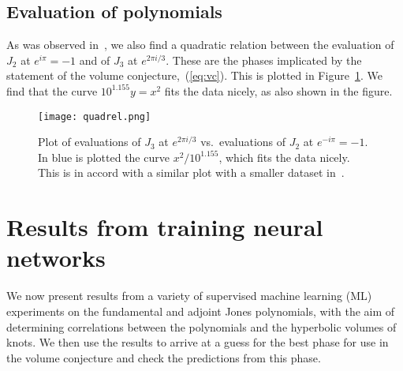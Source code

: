 \documentclass[11pt]{article}
\newcommand{\eref}[1]{(\ref{#1})}
\begin{document}
\subsection{Evaluation of polynomials}

As was observed in~\cite{Craven:2020bdz}, we also find a quadratic relation between the evaluation of $J_2$ at $e^{i\pi}=-1$ and of $J_3$ at $e^{2\pi i/3}$.
These are the phases implicated by the statement of the volume conjecture,~\eref{eq:vc}.
This is plotted in Figure~\ref{fig:quadratic-relation}.
We find that the curve $10^{1.155}y=x^2$ fits the data nicely, as also shown in the figure.

\begin{figure}[h] 
  \begin{center}
    \texttt{[image: quadrel.png]}
  \end{center}
  \caption{\textsf{Plot of evaluations of $J_3$ at $e^{2\pi i/3}$ vs.\ evaluations of $J_2$ at $e^{-i\pi}=-1$. In blue is plotted the curve $x^2/10^{1.155}$, which fits the data nicely. This is in accord with a similar plot with a smaller dataset in~\cite{Craven:2020bdz}.}}  \label{fig:quadratic-relation}
\end{figure}

\section{Results from training neural networks}\label{sec:ml}

We now present results from a variety of supervised machine learning (ML) experiments on the fundamental and adjoint Jones polynomials, with the aim of determining correlations between the polynomials and the hyperbolic volumes of knots.
We then use the results to arrive at a guess for the best phase for use in the volume conjecture and check the predictions from this phase.
\end{document}
